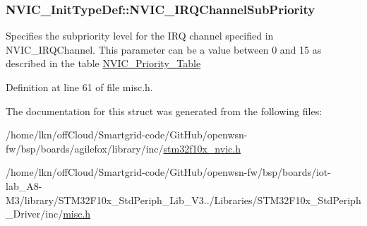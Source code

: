 \subsubsection[{\texorpdfstring{N\+V\+I\+C\+\_\+\+I\+R\+Q\+Channel\+Sub\+Priority}{NVIC_IRQChannelSubPriority}}]{ N\+V\+I\+C\+\_\+\+Init\+Type\+Def\+::\+N\+V\+I\+C\+\_\+\+I\+R\+Q\+Channel\+Sub\+Priority}\hypertarget{struct_n_v_i_c___init_type_def_aecc22a002244e3f1f9448dbe46c1db4b}{}\label{struct_n_v_i_c___init_type_def_aecc22a002244e3f1f9448dbe46c1db4b}
Specifies the subpriority level for the I\+RQ channel specified in N\+V\+I\+C\+\_\+\+I\+R\+Q\+Channel. This parameter can be a value between 0 and 15 as described in the table \hyperlink{group___n_v_i_c___priority___table}{N\+V\+I\+C\+\_\+\+Priority\+\_\+\+Table} 

Definition at line 61 of file misc.\+h.



The documentation for this struct was generated from the following files\+:\begin{DoxyCompactItemize}
\item 
/home/lkn/off\+Cloud/\+Smartgrid-\/code/\+Git\+Hub/openwsn-\/fw/bsp/boards/agilefox/library/inc/\hyperlink{agilefox_2library_2inc_2stm32f10x__nvic_8h}{stm32f10x\+\_\+nvic.\+h}\item 
/home/lkn/off\+Cloud/\+Smartgrid-\/code/\+Git\+Hub/openwsn-\/fw/bsp/boards/iot-\/lab\+\_\+\+A8-\/\+M3/library/\+S\+T\+M32\+F10x\+\_\+\+Std\+Periph\+\_\+\+Lib\+\_\+\+V3../\+Libraries/\+S\+T\+M32\+F10x\+\_\+\+Std\+Periph\+\_\+\+Driver/inc/\hyperlink{iot-lab___a8-_m3_2library_2_s_t_m32_f10x___std_periph___lib___v3_85_80_2_libraries_2_s_t_m32_f10c83060f1a43ea4222dfdbc538c872b4b}{misc.\+h}\end{DoxyCompactItemize}
